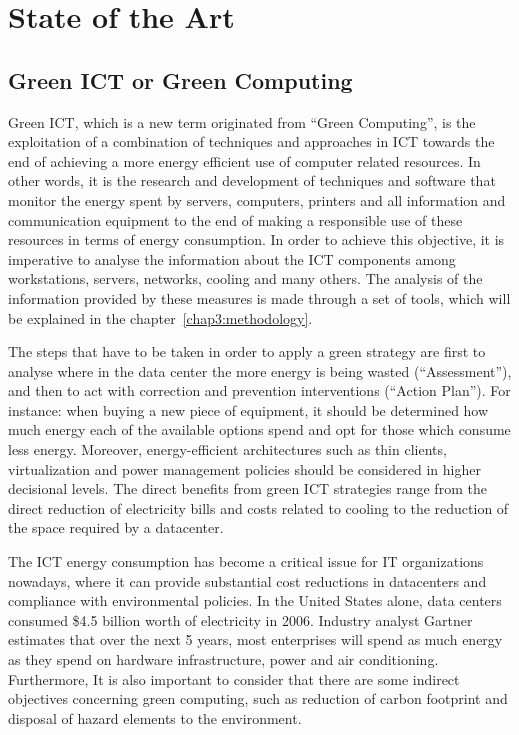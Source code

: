 

\chapter{State of the Art} \label{chap2:state_of_the_art}
    \section{Green ICT or Green Computing} \label{sec2:green_ict}
		Green ICT, which is a new term originated from ``Green Computing'', is the exploitation of a combination of techniques and approaches in ICT towards the end of achieving a more energy efficient use of computer related resources. In other words, it is the research and development of techniques and software that monitor the energy spent by servers, computers, printers and all information and communication equipment to the end of making a responsible use of these resources in terms of energy consumption. In order to achieve this objective, it is imperative to analyse the information about the ICT components among workstations, servers, networks, cooling and many others. The analysis of the information provided by these measures is made through a set of tools, which will be explained in the chapter~\ref{chap3:methodology}.        

		The steps that have to be taken in order to apply a green strategy are first to analyse where in the data center the more energy is being wasted (``Assessment''), and then to act with correction and prevention interventions (``Action Plan''). For instance: when buying a new piece of equipment, it should be determined how much energy each of the available options spend and opt for those which consume less energy. Moreover, energy-efficient architectures such as thin clients, virtualization and power management policies should be considered in higher decisional levels. The direct benefits from green ICT strategies range from the direct reduction of electricity bills and costs related to cooling to the reduction of the space required by a datacenter.

		The ICT energy consumption has become a critical issue for IT organizations nowadays, where it can provide substantial cost reductions in datacenters and compliance with environmental policies. In the United States alone, data centers consumed \$4.5 billion worth of electricity in 2006. Industry analyst Gartner~\cite{GartnetKumar07} estimates that over the next 5 years, most enterprises will spend as much energy as they spend on hardware infrastructure, power and air conditioning. Furthermore, It is also important to consider that there are some indirect objectives concerning green computing, such as reduction of carbon footprint and disposal of hazard elements to the environment.
		
